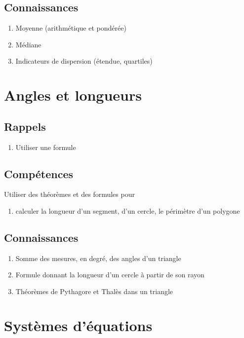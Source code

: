 \documentclass[12pt,a4paper]{article}
\begin{document}
\subsection*{Connaissances}
	\begin{enumerate}
		\item Moyenne (arithmétique et pondérée)
		\item Médiane
		\item Indicateurs de dispersion (étendue, quartiles)
	\end{enumerate}

\section{Angles et longueurs}
\subsection*{Rappels}
\begin{enumerate}
	\item Utiliser une formule
\end{enumerate}
\subsection*{Compétences}
Utiliser des théorèmes et des formules pour
\begin{enumerate}
	
	\item calculer la longueur d'un segment, d'un cercle, le périmètre d'un polygone
	
\end{enumerate}

\subsection*{Connaissances}
\begin{enumerate}
	\item Somme des mesures, en degré, des angles d'un triangle
	\item Formule donnant la longueur d'un cercle à partir de son rayon
	\item Théorèmes de Pythagore et Thalès dans un triangle
	
\end{enumerate}

\section{Systèmes d'équations}
\end{document}
